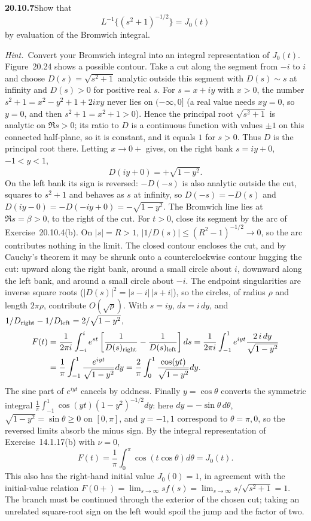 \par\bigskip
\noindent\textbf{20.10.7}\quad Show that
\[
L^{-1}\big\{(s^{2}+1)^{-1/2}\big\}=J_{0}(t)
\]
by evaluation of the Bromwich integral.
\par\emph{Hint.}~Convert your Bromwich integral into an integral
representation of $J_{0}(t)$. Figure~20.24 shows a possible
contour.
\solution
Take a cut along the segment from $-i$ to $i$ and choose
$D(s)=\sqrt{s^2+1}$ analytic outside this segment with
$D(s)\sim s$ at infinity and $D(s)>0$ for positive real $s$.
For $s=x+iy$ with $x>0$, the number $s^2+1=x^2-y^2+1+2ixy$
never lies on $(-\infty,0]$ (a real value needs $xy=0$, so
$y=0$, and then $s^2+1=x^2+1>0$). Hence the principal root
$\sqrt{s^2+1}$ is analytic on $\Re s>0$; its ratio to $D$ is a
continuous function with values $\pm1$ on this connected
half-plane, so it is constant, and it equals $1$ for $s>0$.
Thus $D$ is the principal root there. Letting $x\to0+$ gives,
on the right bank
$s=iy+0$, $-1<y<1$,
\[
D(iy+0)=+\sqrt{1-y^2}.
\]
On the left bank its sign is reversed:
$-D(-s)$ is also analytic outside the cut, squares to
$s^2+1$ and behaves as $s$ at infinity, so $D(-s)=-D(s)$ and
$D(iy-0)=-D(-iy+0)=-\sqrt{1-y^2}$.
The Bromwich line lies at $\Re s=\beta>0$, to the right of the
cut. For $t>0$, close its segment by the arc of
Exercise~20.10.4(b). On $|s|=R>1$,
$|1/D(s)|\le(R^2-1)^{-1/2}\to0$, so the arc contributes
nothing in the limit. The closed contour encloses the cut,
and by Cauchy's theorem it may be shrunk onto a
counterclockwise contour hugging the cut: upward along the
right bank, around a small circle about $i$, downward along
the left bank, and around a small circle about $-i$. The
endpoint singularities are inverse square roots
($|D(s)|^2=|s-i|\,|s+i|$), so the circles, of radius $\rho$
and length $2\pi\rho$, contribute $O(\sqrt\rho)$. With
$s=iy$, $ds=i\,dy$, and
$1/D_{\rm right}-1/D_{\rm left}=2/\sqrt{1-y^2}$,
\begin{align*}
F(t)&=\frac1{2\pi i}
\int_{-i}^{i}e^{st}\left[\frac1{D(s)_{\rm right}}
-\frac1{D(s)_{\rm left}}\right]ds
=\frac1{2\pi i}\int_{-1}^1e^{iyt}
\frac{2\,i\,dy}{\sqrt{1-y^2}}\\
&=\frac1\pi\int_{-1}^1\frac{e^{iyt}}{\sqrt{1-y^2}}dy
=\frac2\pi\int_0^1\frac{\cos(yt)}{\sqrt{1-y^2}}dy.
\end{align*}
The sine part of $e^{iyt}$ cancels by oddness. Finally
$y=\cos\theta$ converts the symmetric integral
$\frac1\pi\int_{-1}^1\cos(yt)(1-y^2)^{-1/2}dy$: here
$dy=-\sin\theta\,d\theta$, $\sqrt{1-y^2}=\sin\theta\ge0$ on
$[0,\pi]$, and $y=-1,1$ correspond to $\theta=\pi,0$, so the
reversed limits absorb the minus sign. By the integral
representation of Exercise~14.1.17(b) with $\nu=0$,
\[
F(t)=\frac1\pi\int_0^\pi\cos(t\cos\theta)d\theta
=\boxed{J_0(t)}.
\]
This also has the right-hand initial value $J_0(0)=1$, in
agreement with the initial-value relation
$F(0+)=\lim_{s\to\infty}sf(s)=\lim_{s\to\infty}s/\sqrt{s^2+1}=1$.
The branch must
be continued through the exterior of the chosen cut; taking
an unrelated square-root sign on the left would spoil the
jump and the factor of two.

